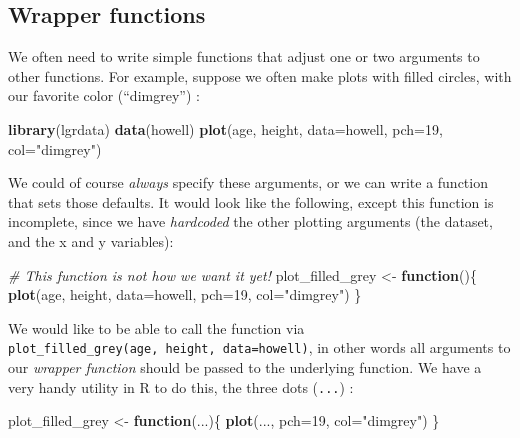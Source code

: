 \documentclass[]{book}
\newenvironment{Shaded}{\begin{snugshade}}{\end{snugshade}}
\newcommand{\CommentTok}[1]{\textcolor[rgb]{0.56,0.35,0.01}{\textit{#1}}}
\newcommand{\ControlFlowTok}[1]{\textcolor[rgb]{0.13,0.29,0.53}{\textbf{#1}}}
\newcommand{\DataTypeTok}[1]{\textcolor[rgb]{0.13,0.29,0.53}{#1}}
\newcommand{\DecValTok}[1]{\textcolor[rgb]{0.00,0.00,0.81}{#1}}
\newcommand{\KeywordTok}[1]{\textcolor[rgb]{0.13,0.29,0.53}{\textbf{#1}}}
\newcommand{\NormalTok}[1]{#1}
\newcommand{\StringTok}[1]{\textcolor[rgb]{0.31,0.60,0.02}{#1}}
\begin{document}
\hypertarget{wrapfunctions}{%
\subsection{Wrapper functions}\label{wrapfunctions}}

We often need to write simple functions that adjust one or two arguments to other functions. For example, suppose we often make plots with filled circles, with our favorite color (``dimgrey'') :

\begin{Shaded}
\begin{Highlighting}[]
\KeywordTok{library}\NormalTok{(lgrdata)}
\KeywordTok{data}\NormalTok{(howell)}
\KeywordTok{plot}\NormalTok{(age, height, }\DataTypeTok{data=}\NormalTok{howell, }\DataTypeTok{pch=}\DecValTok{19}\NormalTok{, }\DataTypeTok{col=}\StringTok{"dimgrey"}\NormalTok{)}
\end{Highlighting}
\end{Shaded}

We could of course \emph{always} specify these arguments, or we can write a function that sets those defaults. It would look like the following, except this function is incomplete, since we have \emph{hardcoded} the other plotting arguments (the dataset, and the x and y variables):

\begin{Shaded}
\begin{Highlighting}[]
\CommentTok{# This function is not how we want it yet!}
\NormalTok{plot_filled_grey <-}\StringTok{ }\ControlFlowTok{function}\NormalTok{()\{}
  \KeywordTok{plot}\NormalTok{(age, height, }\DataTypeTok{data=}\NormalTok{howell, }\DataTypeTok{pch=}\DecValTok{19}\NormalTok{, }\DataTypeTok{col=}\StringTok{"dimgrey"}\NormalTok{)}
\NormalTok{\}}
\end{Highlighting}
\end{Shaded}

We would like to be able to call the function via \texttt{plot\_filled\_grey(age,\ height,\ data=howell)}, in other words all arguments to our \emph{wrapper function} should be passed to the underlying function. We have a very handy utility in R to do this, the three dots (\texttt{...}) :

\begin{Shaded}
\begin{Highlighting}[]
\NormalTok{plot_filled_grey <-}\StringTok{ }\ControlFlowTok{function}\NormalTok{(...)\{}
  \KeywordTok{plot}\NormalTok{(..., }\DataTypeTok{pch=}\DecValTok{19}\NormalTok{, }\DataTypeTok{col=}\StringTok{"dimgrey"}\NormalTok{)}
\NormalTok{\}}
\end{Highlighting}
\end{Shaded}
\end{document}
